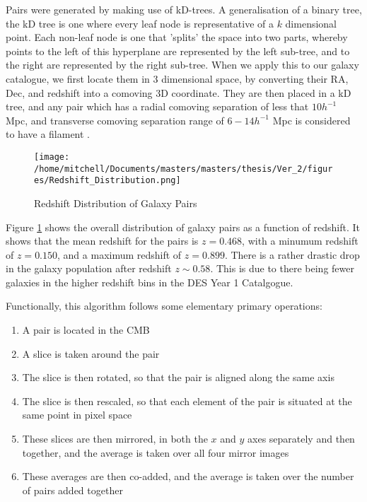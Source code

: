 Pairs were generated by making use of kD-trees. A generalisation of a binary tree, the kD tree is one where every leaf node is representative of a $k$ dimensional point. Each non-leaf node is one that 'splits' the space into two parts, whereby points to the left of this hyperplane are represented by the left sub-tree, and to the right are represented by the right sub-tree. When we apply this to our galaxy catalogue, we first locate them in 3 dimensional space, by converting their RA, Dec, and redshift into a comoving 3D coordinate. They are then placed in a kD tree, and any pair which has a radial comoving separation of less that $10 h^{-1} $ Mpc, and transverse comoving separation range of $6 - 14 h^{-1} $ Mpc is considered to have a filament \citep{2016MNRAS.457.2391C}.


\begin{figure}[h!]
\centering
\texttt{[image: /home/mitchell/Documents/masters/masters/thesis/Ver\_2/figures/Redshift\_Distribution.png]}
\caption{Redshift Distribution of Galaxy Pairs}
\label{fig:pairs_dist}
\end{figure}

Figure \ref{fig:pairs_dist} shows the overall distribution of galaxy pairs as a function of redshift. It shows that the mean redshift for the pairs is $z=0.468$, with a minumum redshift of $z= 0.150$, and a maximum redshift of $z= 0.899$. There is a rather drastic drop in the galaxy population after redshift $z \sim 0.58$. This is due to there being fewer galaxies in the higher redshift bins in the DES Year 1 Catalgogue.  


Functionally, this algorithm follows some elementary primary operations:
\begin{enumerate}[label=(\Roman*)]
\item A pair is located in the CMB \label{step:1}
\item A slice is taken around the pair \label{step:2}
\item The slice is then rotated, so that the pair is aligned along the same axis \label{step:3}
\item The slice is then rescaled, so that each element of the pair is situated at the same point in pixel space \label{step:4}
\item These slices are then mirrored, in both the $x$ and $y$ axes separately and then together, and the average is taken over all four mirror images \label{step:5}
\item These averages are then co-added, and the average is taken over the number of pairs added together \label{step:6}
\end{enumerate}

